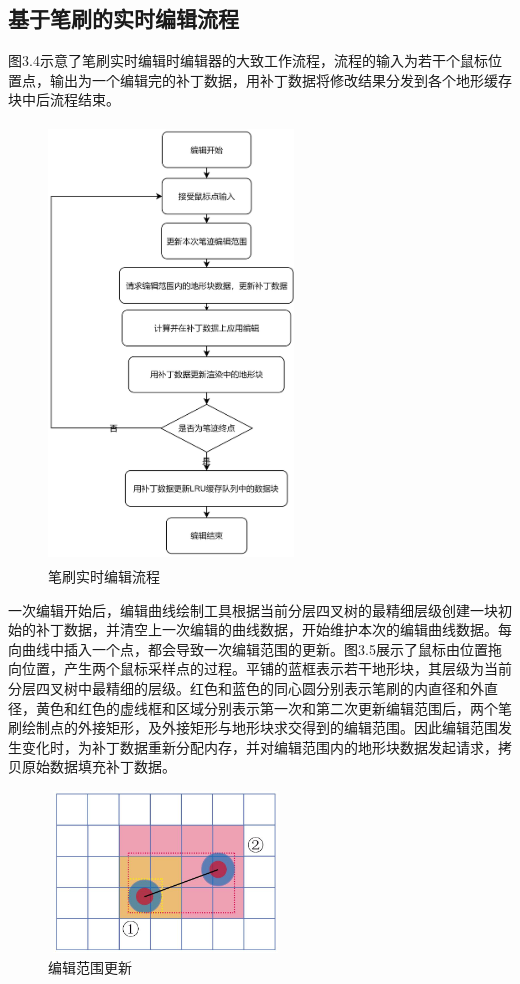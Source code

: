 \subsection{基于笔刷的实时编辑流程}
图3.4示意了笔刷实时编辑时编辑器的大致工作流程，流程的输入为若干个鼠标位置点，输出为一个编辑完的补丁数据，用补丁数据将修改结果分发到各个地形缓存块中后流程结束。\par
\begin{figure}[htbp]
\centering
\includegraphics[height=11.6cm,width=6.5cm]{figures/flowChart.png}
\caption{笔刷实时编辑流程}
\end{figure}
一次编辑开始后，编辑曲线绘制工具根据当前分层四叉树的最精细层级创建一块初始的补丁数据，并清空上一次编辑的曲线数据，开始维护本次的编辑曲线数据。每向曲线中插入一个点，都会导致一次编辑范围的更新。图3.5展示了鼠标由位置拖向位置，产生两个鼠标采样点的过程。平铺的蓝框表示若干地形块，其层级为当前分层四叉树中最精细的层级。红色和蓝色的同心圆分别表示笔刷的内直径和外直径，黄色和红色的虚线框和区域分别表示第一次和第二次更新编辑范围后，两个笔刷绘制点的外接矩形，及外接矩形与地形块求交得到的编辑范围。因此编辑范围发生变化时，为补丁数据重新分配内存，并对编辑范围内的地形块数据发起请求，拷贝原始数据填充补丁数据。\par
\begin{figure}[htbp]
\centering
\includegraphics[height=4.3cm,width=6.2cm]{figures/brushRange.jpg}
\caption{编辑范围更新}
\end{figure}
